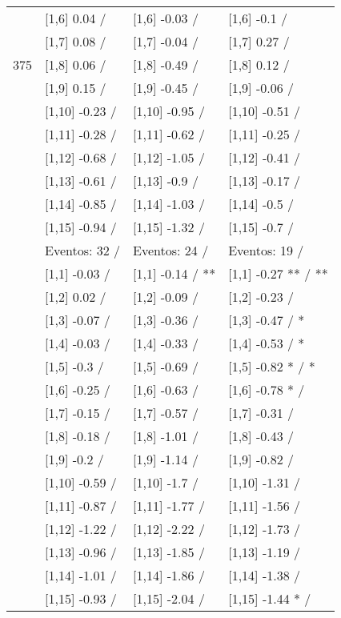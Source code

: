 \begin{table}
\begin{tabular}[t]{llll}
 & {}[1,6] 0.04  / & {}[1,6] -0.03  / & {}[1,6] -0.1  /\\
 & {}[1,7] 0.08  / & {}[1,7] -0.04  / & {}[1,7] 0.27  /\\
375 & {}[1,8] 0.06  / & {}[1,8] -0.49  / & {}[1,8] 0.12  /\\
\addlinespace
 & {}[1,9] 0.15  / & {}[1,9] -0.45  / & {}[1,9] -0.06  /\\
 & {}[1,10] -0.23  / & {}[1,10] -0.95  / & {}[1,10] -0.51  /\\
 & {}[1,11] -0.28  / & {}[1,11] -0.62  / & {}[1,11] -0.25  /\\
 & {}[1,12] -0.68  / & {}[1,12] -1.05  / & {}[1,12] -0.41  /\\
 & {}[1,13] -0.61  / & {}[1,13] -0.9  / & {}[1,13] -0.17  /\\
\addlinespace
 & {}[1,14] -0.85  / & {}[1,14] -1.03  / & {}[1,14] -0.5  /\\
 & {}[1,15] -0.94  / & {}[1,15] -1.32  / & {}[1,15] -0.7  /\\
 & Eventos:  32 / & Eventos:  24 / & Eventos:  19 /\\
 & {}[1,1] -0.03  / & {}[1,1] -0.14  / ** & {}[1,1] -0.27 ** / **\\
 & {}[1,2] 0.02  / & {}[1,2] -0.09  / & {}[1,2] -0.23  /\\
\addlinespace
 & {}[1,3] -0.07  / & {}[1,3] -0.36  / & {}[1,3] -0.47  / *\\
 & {}[1,4] -0.03  / & {}[1,4] -0.33  / & {}[1,4] -0.53  / *\\
 & {}[1,5] -0.3  / & {}[1,5] -0.69  / & {}[1,5] -0.82 * / *\\
 & {}[1,6] -0.25  / & {}[1,6] -0.63  / & {}[1,6] -0.78 * /\\
 & {}[1,7] -0.15  / & {}[1,7] -0.57  / & {}[1,7] -0.31  /\\
\addlinespace
500 & {}[1,8] -0.18  / & {}[1,8] -1.01  / & {}[1,8] -0.43  /\\
 & {}[1,9] -0.2  / & {}[1,9] -1.14  / & {}[1,9] -0.82  /\\
 & {}[1,10] -0.59  / & {}[1,10] -1.7  / & {}[1,10] -1.31  /\\
 & {}[1,11] -0.87  / & {}[1,11] -1.77  / & {}[1,11] -1.56  /\\
 & {}[1,12] -1.22  / & {}[1,12] -2.22  / & {}[1,12] -1.73  /\\
\addlinespace
 & {}[1,13] -0.96  / & {}[1,13] -1.85  / & {}[1,13] -1.19  /\\
 & {}[1,14] -1.01  / & {}[1,14] -1.86  / & {}[1,14] -1.38  /\\
 & {}[1,15] -0.93  / & {}[1,15] -2.04  / & {}[1,15] -1.44 * /\\
\bottomrule
\end{tabular}
\end{table}
